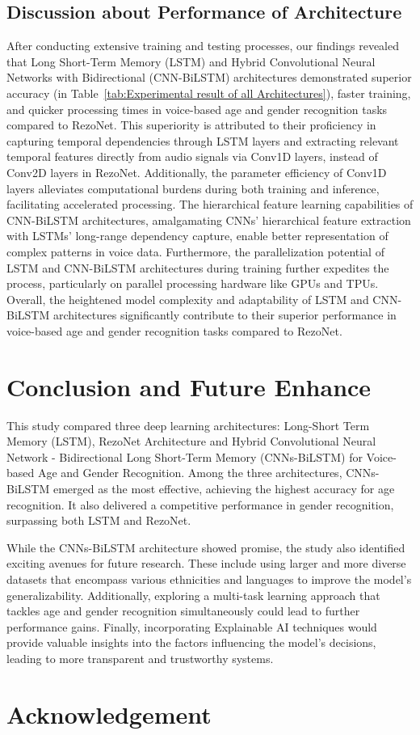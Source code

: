 \documentclass[conference, 10pt,onecolumn]{IEEEtran}
\begin{document}
\subsection{Discussion about Performance of Architecture}

After conducting extensive training and testing processes, our findings revealed that Long Short-Term Memory (LSTM) and Hybrid Convolutional Neural Networks with Bidirectional (CNN-BiLSTM) architectures demonstrated superior accuracy (in Table~\ref{tab:Experimental result of all Architectures}), faster training, and quicker processing times in voice-based age and gender recognition tasks compared to RezoNet. This superiority is attributed to their proficiency in capturing temporal dependencies through LSTM layers and extracting relevant temporal features directly from audio signals via Conv1D layers, instead of Conv2D layers in RezoNet. Additionally, the parameter efficiency of Conv1D layers alleviates computational burdens during both training and inference, facilitating accelerated processing. The hierarchical feature learning capabilities of CNN-BiLSTM architectures, amalgamating CNNs' hierarchical feature extraction with LSTMs' long-range dependency capture, enable better representation of complex patterns in voice data. Furthermore, the parallelization potential of LSTM and CNN-BiLSTM architectures during training further expedites the process, particularly on parallel processing hardware like GPUs and TPUs. Overall, the heightened model complexity and adaptability of LSTM and CNN-BiLSTM architectures significantly contribute to their superior performance in voice-based age and gender recognition tasks compared to RezoNet.

\section{Conclusion and Future Enhance}
This study compared three deep learning architectures: Long-Short Term Memory (LSTM), RezoNet Architecture and Hybrid Convolutional Neural Network - Bidirectional Long Short-Term Memory (CNNs-BiLSTM) for Voice-based Age and Gender Recognition. Among the three architectures, CNNs-BiLSTM emerged as the most effective, achieving the highest accuracy for age recognition. It also delivered a competitive performance in gender recognition, surpassing both LSTM and RezoNet.

While the CNNs-BiLSTM architecture showed promise, the study also identified exciting avenues for future research. These include using larger and more diverse datasets that encompass various ethnicities and languages to improve the model's generalizability. Additionally, exploring a multi-task learning approach that tackles age and gender recognition simultaneously could lead to further performance gains. Finally, incorporating Explainable AI techniques would provide valuable insights into the factors influencing the model's decisions, leading to more transparent and trustworthy systems.

\section{Acknowledgement}
\end{document}
